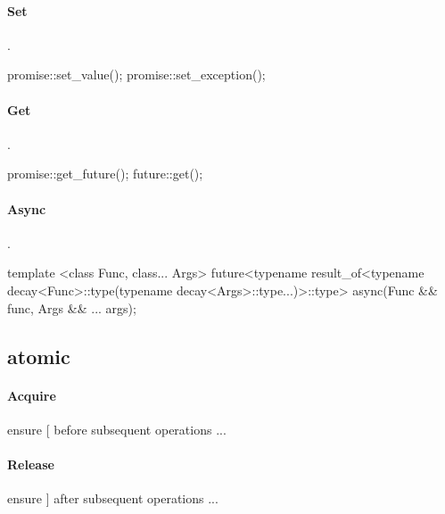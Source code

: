 \paragraph{Set}{.}
\begin{code}
promise::set_value(); promise::set_exception();
\end{code}

\paragraph{Get}{.}
\begin{code}
promise::get_future(); future::get();
\end{code}

\paragraph{Async}{.}
\begin{code}
template <class Func, class... Args>
future<typename result_of<typename decay<Func>::type(typename decay<Args>::type...)>::type>
async(Func && func, Args && ... args);
\end{code}

\subsection*{atomic}
\paragraph{Acquire}{\inlinecode{acquire : [ ...}}
\begin{code}
ensure [ before subsequent operations ...
\end{code}

\paragraph{Release}{\inlinecode{release : ... ]}}
\begin{code}
ensure ] after  subsequent operations ...
\end{code}

